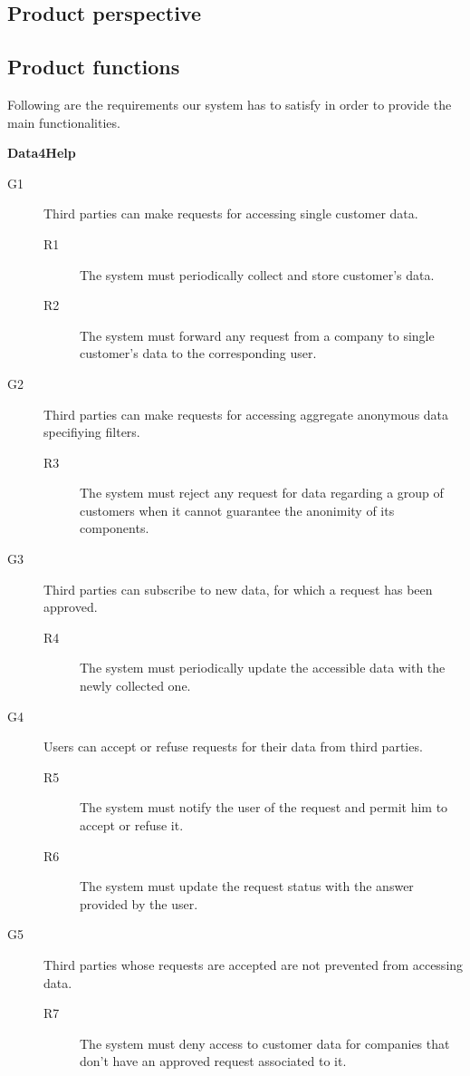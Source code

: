 \documentclass[../main.tex]{subfiles}
\begin{document}
\subsection{Product perspective}
\subsection{Product functions}

\vspace{8mm}

Following are the requirements our system has to satisfy in order to provide the main functionalities.

\vspace{8mm}

{\bf Data4Help}
\begin{description}
	\item [G1]  Third parties can make requests for accessing single customer data.
	\begin{description}
		\item [R1] The system must periodically collect and store customer's data.
		\item [R2] The system must forward any request from a company to single customer's data to the corresponding user.
	\end{description}

	\item [G2]  Third parties can make requests for accessing aggregate anonymous data specifiying filters.
	\begin{description}
		\item [R3] The system must reject any request for data regarding a group of customers when it cannot guarantee the anonimity of its components.
	\end{description}

	\item [G3]  Third parties can subscribe to new data, for which a request has been approved.
	\begin{description}
		\item [R4] The system must periodically update the accessible data with the newly collected one.
	\end{description}

	\item [G4]  Users can accept or refuse requests for their data from third parties.
	\begin{description}
		\item [R5] The system must notify the user of the request and permit him to accept or refuse it.
		\item [R6] The system must update the request status with the answer provided by the user.
	\end{description}

	\item [G5]  Third parties whose requests are accepted are not prevented from accessing data.
	\begin{description}
		\item [R7] The system must deny access to customer data for companies that don't have an approved request associated to it.
	\end{description}
\end{description}
\end{document}
